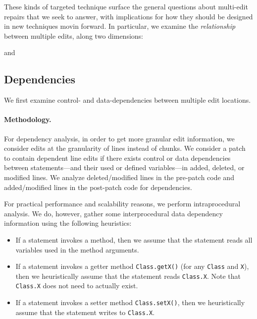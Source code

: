 \documentclass[sigconf, timestamp-false, anonymous=true]{acmart}
\begin{document}
These kinds of targeted technique surface the general questions about
multi-edit repairs that we seek to answer, with
implications for how they should be designed in new techniques movin forward.
In particular, we examine the \emph{relationship} between multiple edits, along
two dimensions:


and




\subsection{Dependencies}

We first examine control- and data-dependencies between multiple edit locations. 

\paragraph{Methodology.} For dependency analysis, 
in order to get more granular edit information,
we consider edits at the granularity of lines instead of chunks.
We consider a patch to contain dependent line edits if there exists 
control or data dependencies between statements---and their used or defined 
variables---in added, deleted, or modified lines. We analyze deleted/modified 
lines in the pre-patch code and added/modified lines in the post-patch code
for dependencies.
  
For practical performance and scalability reasons, 
we perform intraprocedural analysis. 
We do, however, gather some interprocedural data dependency information 
using the following heuristics:
\begin{itemize}
	\item If a statement invokes a method, then we assume that
	the statement reads all variables used in the method arguments.
	\item If a statement invokes a getter method \texttt{Class.getX()} 
	(for any \texttt{Class} and \texttt{X}), then we heuristically 
	assume that the statement reads \texttt{Class.X}. 
	Note that \texttt{Class.X} does not need to actually exist.
	\item If a statement invokes a setter method \texttt{Class.setX()}, 
	then we heuristically assume that the statement writes to \texttt{Class.X}. 
\end{itemize}
\end{document}
